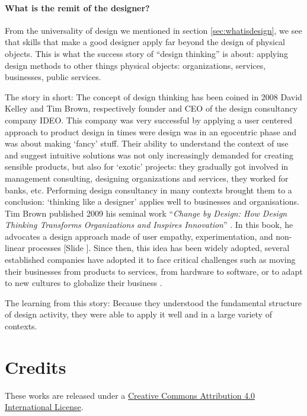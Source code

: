 \documentclass{article}
\newcounter{slide}
\begin{document}
\paragraph{What is the remit of the designer?} From the universality of design we mentioned in section \ref{sec:whatisdesign}, we see that skills that make a good designer apply far beyond the design of physical objects. This is what the success story of ``design thinking'' is about: applying design methods to other things physical objects: organizations, services, businesses, public services. 

The story in short: The concept of design thinking has been coined in 2008 David Kelley and Tim Brown, respectively founder and CEO of the design consultancy company IDEO. This company was very successful by applying a user centered approach to product design in times were design was in an egocentric phase and was about making `fancy' stuff. Their ability to understand the context of use and suggest intuitive solutions was not only increasingly demanded for creating sensible products, but also for `exotic' projects: they gradually got involved in management consulting, designing organizations and services, they worked for banks, etc. Performing design consultancy in many contexts brought them to a conclusion: `thinking like a designer' applies well to businesses and organisations. Tim Brown published 2009 his seminal work ``\emph{Change by Design: How Design Thinking Transforms Organizations and Inspires Innovation}'' \cite{brownChangeDesignHow2009}. In this book, he advocates a design approach made of user empathy, experimentation, and non-linear processes {\color{blue}[Slide ]}. Since then, this idea has been widely adopted, several established companies have adopted it to face critical challenges such as moving their businesses from products to services, from hardware to software, or to adapt to new cultures to globalize their business \cite{kolkoDesignThinkingComes2015}.

The learning from this story: Because they understood the fundamental structure of design activity, they were able to apply it well and in a large variety of contexts.

\section*{Credits}
\label{sec:credits}
These works are released under a \href{https://creativecommons.org/licenses/by/4.0/}{Creative Commons Attribution 4.0 International License}.




\end{document}

